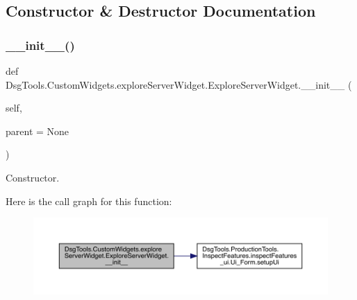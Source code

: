 \subsection{Constructor \& Destructor Documentation}
\mbox{\label{class_dsg_tools_1_1_custom_widgets_1_1explore_server_widget_1_1_explore_server_widget_ae6bb6a0d26af06fb37272ed7f8f3eeb5}} 
\subsubsection{\texorpdfstring{\+\_\+\+\_\+init\+\_\+\+\_\+()}{\_\_init\_\_()}}
{\footnotesize\ttfamily def Dsg\+Tools.\+Custom\+Widgets.\+explore\+Server\+Widget.\+Explore\+Server\+Widget.\+\_\+\+\_\+init\+\_\+\+\_\+ (\begin{DoxyParamCaption}\item[{}]{self,  }\item[{}]{parent = {\ttfamily None} }\end{DoxyParamCaption})}

\begin{DoxyVerb}Constructor.\end{DoxyVerb}
 Here is the call graph for this function\+:
\nopagebreak
\begin{figure}[H]
\begin{center}
\leavevmode
\includegraphics[width=350pt]{class_dsg_tools_1_1_custom_widgets_1_1explore_server_widget_1_1_explore_server_widget_ae6bb6a0d26af06fb37272ed7f8f3eeb5_cgraph}
\end{center}
\end{figure}


